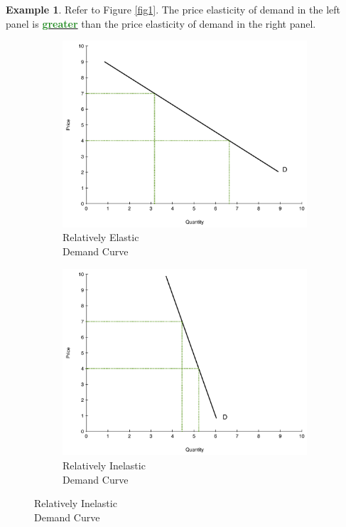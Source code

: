 \documentclass[11pt]{article}\usepackage[]{graphicx}\usepackage[]{color}
\theoremstyle{definition}
\newtheorem{exmp}{Example}[section]
\newcommand{\dd}[1]{{\underline{\textbf{\textcolor{ForestGreen}{#1}}}}}
\begin{document}
	\begin{exmp}
		Refer to Figure \ref{fig1}. The price elasticity of demand in the left panel is \dd{greater} than the price elasticity of demand in the right panel.
	
	\begin{figure}[H]
		\centering
		\caption{Comparing Demand Elasticities}
		\label{fig1}
		\begin{subfigure}{.5\textwidth}
			\includegraphics[scale=.3]{notes04_plot1.pdf}
			\caption{Relatively Elastic\\ Demand Curve}
		\end{subfigure}%
		\begin{subfigure}{.5\textwidth}
			\centering
			\includegraphics[scale=.3]{notes04_plot2.pdf}
			\caption{Relatively Inelastic \\ Demand Curve}
		\end{subfigure}
	\end{figure}
\end{exmp}
\end{document}
